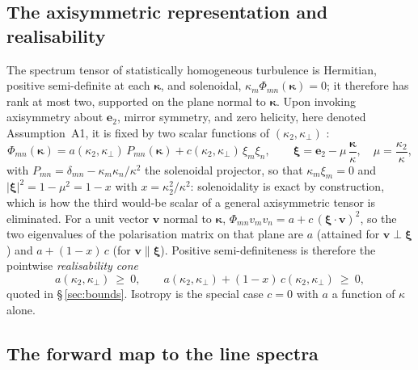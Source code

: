 \documentclass[lineno]{JFM-FLM_Au}
\begin{document}
\subsection{The axisymmetric representation and realisability}
\label{app:twoscalar}

The spectrum tensor of statistically homogeneous turbulence is Hermitian,
positive semi-definite at each $\boldsymbol{\kappa}$, and solenoidal,
$\kappa_m\Phi_{mn}(\boldsymbol{\kappa})=0$; it therefore has rank at most
two, supported on the plane normal to $\boldsymbol{\kappa}$. Upon invoking axisymmetry about $\boldsymbol{e}_2$, mirror symmetry, and zero helicity, here denoted Assumption~A1, it is fixed by two scalar functions of $(\kappa_2,\kappa_\perp)$
\citep{Batchelor1946,ChandrasekharAxisym1950,Lindborg1995}:
\begin{equation}
  \Phi_{mn}(\boldsymbol{\kappa})
  = a(\kappa_2,\kappa_\perp)\,P_{mn}(\boldsymbol{\kappa})
  + c(\kappa_2,\kappa_\perp)\,\xi_m\xi_n,
  \qquad
  \boldsymbol{\xi} = \boldsymbol{e}_2 - \mu\,
  \frac{\boldsymbol{\kappa}}{\kappa},
  \quad \mu=\frac{\kappa_2}{\kappa},
  \label{eq:twoscalar}
\end{equation}
with $P_{mn}=\delta_{mn}-\kappa_m\kappa_n/\kappa^2$ the solenoidal
projector, so that $\kappa_m\xi_m=0$ and
$|\boldsymbol{\xi}|^2=1-\mu^2=1-x$ with $x=\kappa_2^2/\kappa^2$:
solenoidality is exact by construction, which is how the third would-be
scalar of a general axisymmetric tensor is eliminated. For a unit vector
$\boldsymbol{v}$ normal to $\boldsymbol{\kappa}$,
$\Phi_{mn}v_mv_n = a + c\,(\boldsymbol{\xi}\cdot\boldsymbol{v})^2$, so the
two eigenvalues of the polarisation matrix on that plane are $a$ (attained
for $\boldsymbol{v}\perp\boldsymbol{\xi}$) and $a+(1-x)\,c$ (for
$\boldsymbol{v}\parallel\boldsymbol{\xi}$). Positive semi-definiteness is
therefore the pointwise \emph{realisability cone}
\begin{equation}
  a(\kappa_2,\kappa_\perp)\ \ge\ 0,
  \qquad
  a(\kappa_2,\kappa_\perp) + (1-x)\,c(\kappa_2,\kappa_\perp)\ \ge\ 0 ,
  \label{eq:cone}
\end{equation}
quoted in \S\,\ref{sec:bounds}. Isotropy is the special case $c=0$ with
$a$ a function of $\kappa$ alone.

\subsection{The forward map to the line spectra}\label{app:fwdmap}
\end{document}
